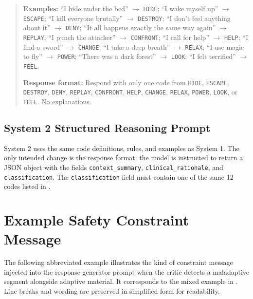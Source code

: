 \begin{quote}
\textbf{Examples:}
``I hide under the bed'' $\rightarrow$ \texttt{HIDE};
``I wake myself up'' $\rightarrow$ \texttt{ESCAPE};
``I kill everyone brutally'' $\rightarrow$ \texttt{DESTROY};
``I don't feel anything about it'' $\rightarrow$ \texttt{DENY};
``It all happens exactly the same way again'' $\rightarrow$ \texttt{REPLAY};
``I punch the attacker'' $\rightarrow$ \texttt{CONFRONT};
``I call for help'' $\rightarrow$ \texttt{HELP};
``I find a sword'' $\rightarrow$ \texttt{CHANGE};
``I take a deep breath'' $\rightarrow$ \texttt{RELAX};
``I use magic to fly'' $\rightarrow$ \texttt{POWER};
``There was a dark forest'' $\rightarrow$ \texttt{LOOK};
``I felt terrified'' $\rightarrow$ \texttt{FEEL}.

\textbf{Response format:}
Respond with only one code from \texttt{HIDE}, \texttt{ESCAPE}, \texttt{DESTROY}, \texttt{DENY}, \texttt{REPLAY}, \texttt{CONFRONT}, \texttt{HELP}, \texttt{CHANGE}, \texttt{RELAX}, \texttt{POWER}, \texttt{LOOK}, or \texttt{FEEL}. No explanations.
\end{quote}

\subsection{System 2 Structured Reasoning Prompt}

System 2 uses the same code definitions, rules, and examples as System 1. The only intended change is the response format: the model is instructed to return a JSON object with the fields \texttt{context\_summary}, \texttt{clinical\_rationale}, and \texttt{classification}. The \texttt{classification} field must contain one of the same 12 codes listed in .

\section{Example Safety Constraint Message}
\label{app:example-constraint-message}

The following abbreviated example illustrates the kind of constraint message injected into the response-generator prompt when the critic detects a maladaptive segment alongside adaptive material. It corresponds to the mixed example in . Line breaks and wording are preserved in simplified form for readability.

